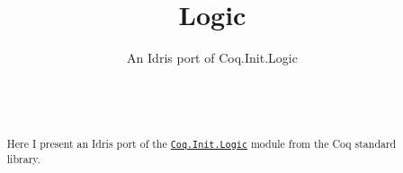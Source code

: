 \documentclass{acm_proc_article-sp}
\begin{document}
\title{Logic}
\subtitle{An Idris port of Coq.Init.Logic}

\author{
    \alignauthor {}\\
\\
  }

\date{}


\maketitle
\begin{abstract}
Here I present an Idris port of the
\href{https://coq.inria.fr/library/Coq.Init.Logic.html}{\texttt{Coq.Init.Logic}}
module from the Coq standard library.
\end{abstract}






\end{document}
